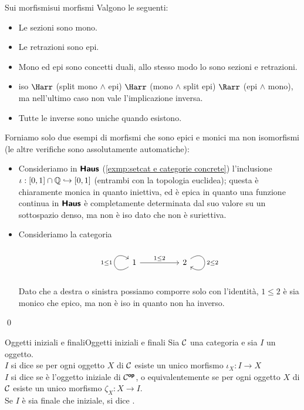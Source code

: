 \documentclass{article}
\renewcommand\C{\mc{C}}
\begin{document}
\begin{remark}{Sui morfismi}{sui morfismi}
    Valgono le seguenti:\begin{itemize}
        \item Le sezioni sono mono.
        \item Le retrazioni sono epi.
        \item Mono ed epi sono concetti duali, allo stesso modo lo sono sezioni e retrazioni.
        \item iso $\Harr$ (split mono $\wedge$ epi) $\Harr$ (mono $\wedge$ split epi) $\Rarr$ (epi $\wedge$ mono), ma nell'ultimo caso non vale l'implicazione inversa.
        \item Tutte le inverse sono uniche quando esistono.
    \end{itemize}
    \proof 
    Forniamo solo due esempi di morfismi che sono epici e monici ma non isomorfismi (le altre verifiche sono assolutamente automatiche):\begin{itemize}
        \item Consideriamo in $\text{\sffamily\textbf{Haus}}$ (\ref{exmp:setcat e categorie concrete}) l'inclusione $\iota: [0,1]\cap \mathbb{Q}\hookrightarrow[0,1]$ (entrambi con la topologia euclidea); questa è chiaramente monica in quanto iniettiva, ed è epica in quanto una funzione continua in $\text{\sffamily\textbf{Haus}}$ è completamente determinata dal suo valore su un sottospazio denso, ma non è iso dato che non è suriettiva.
        \item Consideriamo la categoria
        \[\begin{tikzcd}
        	1 && 2
    	    \arrow["1\le 1", from=1-1, to=1-1, loop, in=145, out=215, distance=10mm]
        	\arrow["1\le 2", from=1-1, to=1-3]
    	    \arrow["2\le 2", from=1-3, to=1-3, loop, in=325, out=35, distance=10mm]
        \end{tikzcd}\]
        Dato che a destra o sinistra possiamo comporre solo con l'identità, $1\le 2$ è sia monico che epico, ma non è iso in quanto non ha inverso.
    \end{itemize}
    \qed
\end{remark}

\begin{definition}{Oggetti iniziali e finali}{Oggetti iniziali e finali}
    Sia $\C$ una categoria e sia $I$ un oggetto.\\
    $I$ si dice  se per ogni oggetto $X$ di $\C$ esiste un unico morfismo $\iota_X:I\to X$\\
    $I$ si dice  se è l'oggetto iniziale di $\C^\op$, o equivalentemente se per ogni oggetto $X$ di $\C$ esiste un unico morfismo $\zeta_X : X\to I$.\\
    Se $I$ è sia finale che iniziale, si dice .
\end{definition}
\end{document}
